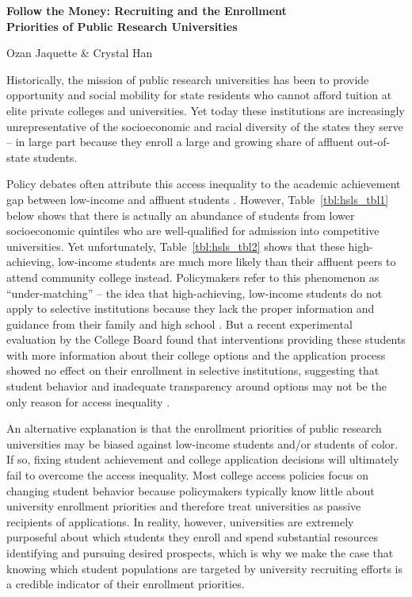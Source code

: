\documentclass{article}
\begin{document}
\sloppy




{\LARGE\noindent\bfseries Follow the Money: Recruiting and the Enrollment \\Priorities of Public Research Universities}

{\noindent\large Ozan Jaquette \& Crystal Han}


Historically, the mission of public research universities has been to provide opportunity and social mobility for state residents who cannot afford tuition at elite private colleges and universities. Yet today these institutions are increasingly unrepresentative of the socioeconomic and racial diversity of the states they serve -- in large part because they enroll a large and growing share of affluent out-of-state students.

Policy debates often attribute this access inequality to the academic achievement gap between low-income and affluent students \citep{RN4016}. However, Table~\ref{tbl:hsls_tbl1} below shows that there is actually an abundance of students from lower socioeconomic quintiles who are well-qualified for admission into competitive universities. Yet unfortunately, Table~\ref{tbl:hsls_tbl2} shows that these high-achieving, low-income students are much more likely than their affluent peers to attend community college instead. Policymakers refer to this phenomenon as ``under-matching'' -- the idea that high-achieving, low-income students do not apply to selective institutions because they lack the proper information and guidance from their family and high school \citep{RN3699}. But a recent experimental evaluation by the College Board found that interventions providing these students with more information about their college options and the application process showed no effect on their enrollment in selective institutions, suggesting that student behavior and inadequate transparency around options may not be the only reason for access inequality \citep{RN4468}.

An alternative explanation is that the enrollment priorities of public research universities may be biased against low-income students and/or students of color. If so, fixing student achievement and college application decisions will ultimately fail to overcome the access inequality. Most college access policies focus on changing student behavior because policymakers typically know little about university enrollment priorities and therefore treat universities as passive recipients of applications. In reality, however, universities are extremely purposeful about which students they enroll and spend substantial resources identifying and pursuing desired prospects, which is why we make the case that knowing which student populations are targeted by university recruiting efforts is a credible indicator of their enrollment priorities. 
\end{document}
